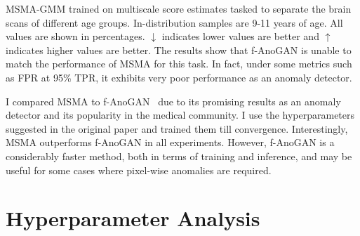\begin{table}[tbhp]
\caption{MSMA-GMM trained on multiscale score estimates tasked to separate the brain scans of different age groups. In-distribution samples are 9-11 years of age. All values are shown in percentages. $\downarrow$ indicates lower values are better and $\uparrow$ indicates higher values are better. The results show that f-AnoGAN is unable to match the performance of MSMA for this task. In fact, under some metrics such as FPR at 95\% TPR, it exhibits very poor performance as an anomaly detector.}

\label{brain_perf}
\end{table}

I compared MSMA to f-AnoGAN~\cite{schlegl2019f} due to its promising results as an anomaly detector and its popularity in the medical community. I use the hyperparameters suggested in the original paper and trained them till convergence. Interestingly, MSMA outperforms f-AnoGAN in all experiments. However, f-AnoGAN is a considerably faster method, both in terms of training and inference, and may be useful for some cases where pixel-wise anomalies are required.


\section{Hyperparameter Analysis}
\label{hyperparams}

